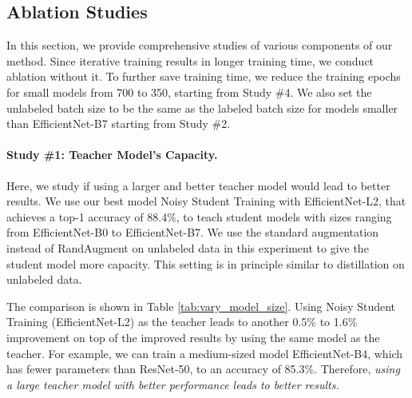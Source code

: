 \documentclass[10pt,twocolumn,letterpaper]{article}
\begin{document}
\subsection{Ablation Studies}
\label{sec:ablation_study}
In this section, we provide comprehensive studies of various components of our method. 
Since iterative training results in longer training time, we conduct ablation without it. To further save training time, we reduce the training epochs for small models from 700 to 350, starting from Study \#4. We also set the unlabeled batch size to be the same as the labeled batch size for models smaller than EfficientNet-B7 starting from Study \#2.
 
\paragraph{Study \#1: Teacher Model's Capacity.}
Here, we study if using a larger and better teacher model would lead to better results. 
We use our best model Noisy Student Training with EfficientNet-L2, that achieves a top-1 accuracy of 88.4\%, to teach student models with sizes ranging from  EfficientNet-B0 to EfficientNet-B7. We use the standard augmentation instead of RandAugment on unlabeled data in this experiment to give the student model more capacity. This setting is in principle similar to distillation on unlabeled data. 

The comparison is shown in Table \ref{tab:vary_model_size}. Using Noisy Student Training (EfficientNet-L2) as the teacher leads to another 0.5\% to 1.6\%
improvement on top of the improved results by using the same model as the teacher. For example, we can train a medium-sized model EfficientNet-B4, which has fewer parameters than ResNet-50, to an accuracy of 85.3\%. Therefore, \emph{using a large teacher model with better performance leads to better results.}
\end{document}
